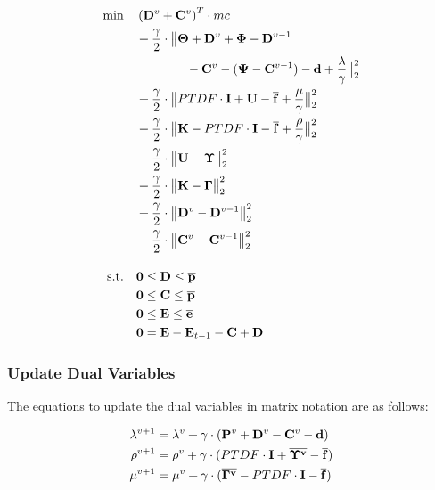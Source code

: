  \begin{subequations}
	\begin{align}
		 \min \quad & \left(\vb{D}^v + \vb{C}^v\right)^T \cdot mc\\
		 & + \frac{\gamma}{2} \cdot \big\| \vb{\Theta} + \vb{D}^v + \vb{\Phi} - \vb{D}^{v-1} \nonumber \\
		 & \qquad \qquad - \vb{C}^v - (\vb{\Psi} - \vb{C}^{v-1}) - \vb{d} + \frac{\vb{\lambda}}{\gamma} \big\|^2_2 \nonumber \\
		 & + \frac{\gamma}{2} \cdot \big\| PTDF \cdot \vb{I} + \vb{U} - \vb{\overline{f}} + \frac{\vb{\mu}}{\gamma}\big\|^2_2 \nonumber \\
		 & + \frac{\gamma}{2} \cdot \big\| \vb{K} - PTDF \cdot \vb{I} - \vb{\overline{f}} + \frac{\vb{\rho}}{\gamma}\big\|^2_2 \nonumber \\
		 & + \frac{\gamma}{2} \cdot \big\| \vb{U} - \vb{\Upsilon} \big\|^2_2 \nonumber\\
		 & + \frac{\gamma}{2} \cdot \big\| \vb{K} - \vb{\Gamma} \big\|^2_2 \nonumber \\
		 & + \frac{\gamma}{2} \cdot \big\| \vb{D}^v - \vb{D}^{v-1}\big\|^2_2 \nonumber \\
		 & + \frac{\gamma}{2} \cdot \big\| \vb{C}^v - \vb{C}^{v-1}\big\|^2_2 \nonumber \\[10pt]
		 \text{s.t.} \quad & \vb{0} \leq \vb{D} \leq \vb{\overline{p}} \\
		 & \vb{0} \leq \vb{C} \leq \vb{\overline{p}} \\
		 & \vb{0} \leq \vb{E} \leq \vb{\overline{e}}\\
		 & \vb{0} = \vb{E} - \vb{E}_{t-1} - \vb{C} + \vb{D}
	\end{align}
\end{subequations}

\subsubsection*{Update Dual Variables}

The equations to update the dual variables in matrix notation are as follows:

\begin{subequations}
	\begin{align}
		\lambda^{v+1} &= \lambda^{v} + \gamma \cdot (\vb{P}^v + \vb{D}^{v} - \vb{C}^v - \vb{d}) \\
		\rho^{v+1} &= \rho^{v} + \gamma \cdot (PTDF \cdot \vb{I} + \vb{\overline{\Upsilon^v}} - \vb{\overline{f}}) \\
		\mu^{v+1} &= \mu^{v} + \gamma \cdot (\vb{\overline{\Gamma^v}} - PTDF \cdot \vb{I} - \vb{\overline{f}})
	\end{align}
\end{subequations}


